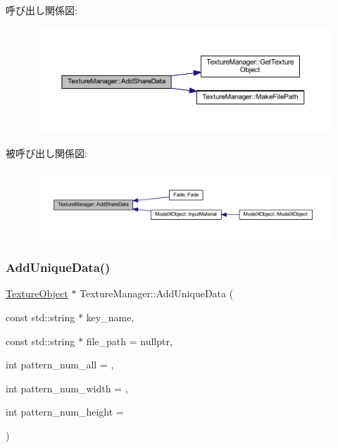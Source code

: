 呼び出し関係図\+:\nopagebreak
\begin{figure}[H]
\begin{center}
\leavevmode
\includegraphics[width=350pt]{class_texture_manager_a571c5b288fe16c53965f45d8bd7c8769_cgraph}
\end{center}
\end{figure}
被呼び出し関係図\+:\nopagebreak
\begin{figure}[H]
\begin{center}
\leavevmode
\includegraphics[width=350pt]{class_texture_manager_a571c5b288fe16c53965f45d8bd7c8769_icgraph}
\end{center}
\end{figure}
\mbox{\label{class_texture_manager_af86003fd2afaf09f0295745d486e42e4}} 
\subsubsection{\texorpdfstring{Add\+Unique\+Data()}{AddUniqueData()}}
{\footnotesize\ttfamily \mbox{\hyperlink{class_texture_object}{Texture\+Object}} $\ast$ Texture\+Manager\+::\+Add\+Unique\+Data (\begin{DoxyParamCaption}\item[{const std\+::string $\ast$}]{key\+\_\+name,  }\item[{const std\+::string $\ast$}]{file\+\_\+path = {\ttfamily nullptr},  }\item[{int}]{pattern\+\_\+num\+\_\+all = {},  }\item[{int}]{pattern\+\_\+num\+\_\+width = {},  }\item[{int}]{pattern\+\_\+num\+\_\+height = {} }\end{DoxyParamCaption})\hspace{0.3cm}{\ttfamily [static]}}



